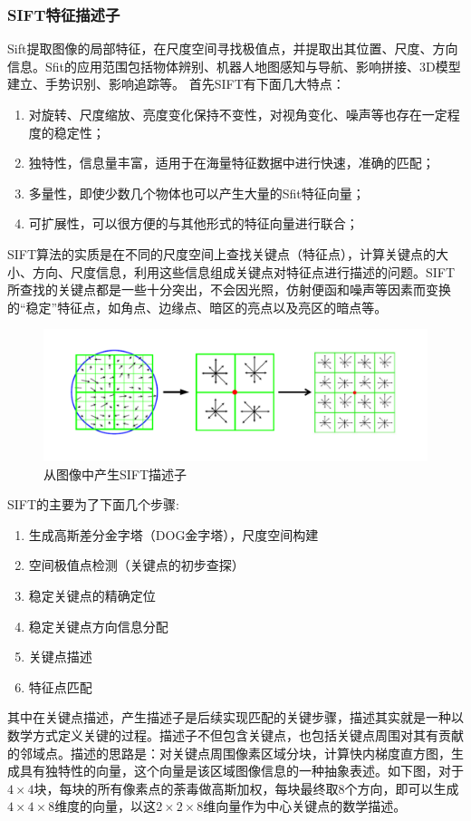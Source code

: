 \documentclass{article}
\begin{document}
\subsubsection{SIFT特征描述子}
Sift提取图像的局部特征，在尺度空间寻找极值点，并提取出其位置、尺度、方向信息。Sfit的应用范围包括物体辨别、机器人地图感知与导航、影响拼接、3D模型建立、手势识别、影响追踪等。
首先SIFT有下面几大特点：
\begin{enumerate}
    \item 对旋转、尺度缩放、亮度变化保持不变性，对视角变化、噪声等也存在一定程度的稳定性；
    \item 独特性，信息量丰富，适用于在海量特征数据中进行快速，准确的匹配；
    \item 多量性，即使少数几个物体也可以产生大量的Sfit特征向量；
    \item 可扩展性，可以很方便的与其他形式的特征向量进行联合；
\end{enumerate}
SIFT算法的实质是在不同的尺度空间上查找关键点（特征点），计算关键点的大小、方向、尺度信息，利用这些信息组成关键点对特征点进行描述的问题。SIFT所查找的关键点都是一些十分突出，不会因光照，仿射便函和噪声等因素而变换的“稳定”特征点，如角点、边缘点、暗区的亮点以及亮区的暗点等。

\begin{figure}[h]
    \centering
    \includegraphics[width=\textwidth]{./project2/SIFT.png}
    \caption{从图像中产生SIFT描述子}
\end{figure}

SIFT的主要为了下面几个步骤:
\begin{enumerate}
	\item 生成高斯差分金字塔（DOG金字塔），尺度空间构建
	\item 空间极值点检测（关键点的初步查探）
	\item  稳定关键点的精确定位
	\item 稳定关键点方向信息分配
	\item 关键点描述
	\item  特征点匹配
\end{enumerate}
其中在关键点描述，产生描述子是后续实现匹配的关键步骤，描述其实就是一种以数学方式定义关键的过程。描述子不但包含关键点，也包括关键点周围对其有贡献的邻域点。描述的思路是：对关键点周围像素区域分块，计算快内梯度直方图，生成具有独特性的向量，这个向量是该区域图像信息的一种抽象表述。如下图，对于$4\times 4$块，每块的所有像素点的荼毒做高斯加权，每块最终取8个方向，即可以生成$4\times 4\times 8$维度的向量，以这$2\times 2\times 8$维向量作为中心关键点的数学描述。
\end{document}
